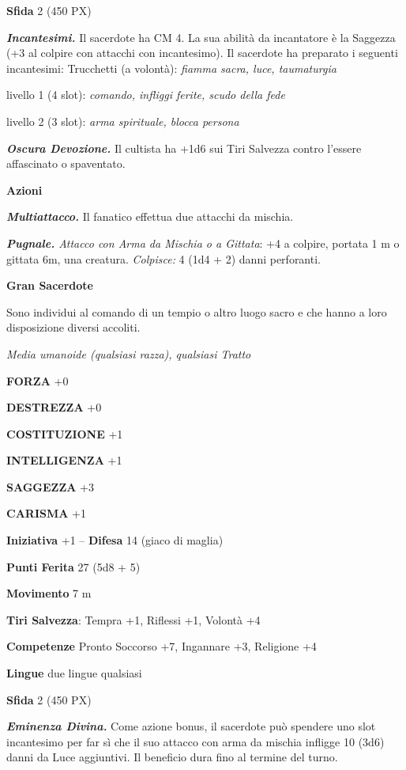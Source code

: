 \begin{multicols}{2}
\textbf{Sfida} 2 (450 PX)

\textit{\textbf{Incantesimi.}} Il sacerdote ha CM 4. La sua abilità da incantatore è la Saggezza (+3 al colpire con attacchi con incantesimo). Il sacerdote ha preparato i seguenti incantesimi: Trucchetti (a volontà): \textit{fiamma sacra, luce, taumaturgia}

livello 1 (4 slot): \textit{comando, infliggi ferite, scudo della fede}

livello 2 (3 slot): \textit{arma spirituale, blocca persona}

\textit{\textbf{Oscura Devozione.}} Il cultista ha +1d6 sui Tiri Salvezza contro l'essere affascinato o spaventato.

\textbf{Azioni}

\textit{\textbf{Multiattacco.}} Il fanatico effettua due attacchi da mischia.

\textit{\textbf{Pugnale.} Attacco con Arma da Mischia o a Gittata}: +4 a colpire, portata 1 m o gittata 6m, una creatura. \textit{Colpisce:} 4 (1d4 + 2) danni perforanti.

\medskip\textbf{Gran Sacerdote}

Sono individui al comando di un tempio o altro luogo sacro e che hanno a loro disposizione diversi accoliti.

\textit{Media umanoide (qualsiasi razza), qualsiasi Tratto}

\textbf{FORZA} +0

\textbf{DESTREZZA} +0

\textbf{COSTITUZIONE} +1

\textbf{INTELLIGENZA} +1

\textbf{SAGGEZZA} +3

\textbf{CARISMA} +1

\textbf{Iniziativa} +1 -- \textbf{Difesa} 14 (giaco di maglia)

\textbf{Punti Ferita} 27 (5d8 + 5)

\textbf{Movimento} 7 m

\textbf{Tiri Salvezza}: Tempra +1, Riflessi +1, Volontà +4

\textbf{Competenze} Pronto Soccorso +7, Ingannare +3, Religione +4

\textbf{Lingue} due lingue qualsiasi

\textbf{Sfida} 2 (450 PX)

\textit{\textbf{Eminenza Divina.}} Come azione bonus, il sacerdote può spendere uno slot incantesimo per far sì che il suo attacco con arma da mischia infligge 10 (3d6) danni da Luce aggiuntivi. Il beneficio dura fino al termine del turno.


\end{multicols}
